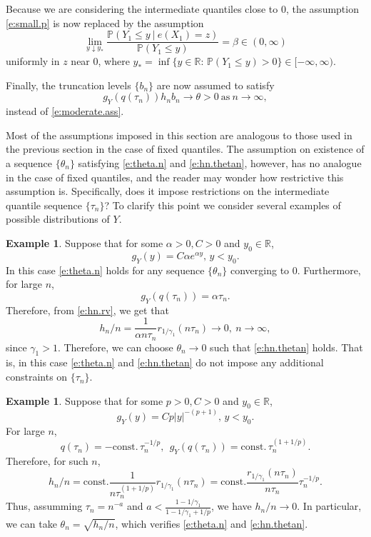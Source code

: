 \documentclass[12pt]{amsart}
\newcommand{\bbr}{\mathbb{R}}
\newcommand{\1}{\mathbbm{1}}
\newcommand{\0}{\mathbf{0}}
\theoremstyle{plain}
\theoremstyle{definition}
\newtheorem{example}[theorem]{Example}
\newcommand{\bbP}{\mathbb{P}}
\begin{document}
Because we are considering the intermediate quantiles close to $0$, the assumption \eqref{e:small.p} is now  replaced by the
assumption
%
\begin{equation} \label{e:small.p.interm}
  \lim_{y\downarrow y_*  } \frac{\bbP(Y_1\leq y\ | \ e(X_1)=z)}{\bbP(Y_1\leq
  y)}=\beta\in (0,\infty)
\end{equation}
%
uniformly in $z$ near 0, where $y_*=\inf\{ y\in\bbr:\, \bbP(Y_1\leq y)>0\}\in [-\infty, \infty)$. 
 

Finally, the truncation levels $\{b_n\}$ are now assumed to satisfy 
\begin{equation} \label{e:bn.ass.interm}
 g_Y(q(\tau_n))   h_nb_n\to \theta>0 \ \text{as} \ n\to\infty,
  \end{equation}
instead of \eqref{e:moderate.ass}. 
 
Most of the assumptions imposed in this section are analogous to those used in the previous section in the case of fixed quantiles. The assumption on existence of a sequence $\{\theta_n\}$ satisfying \eqref{e:theta.n} and \eqref{e:hn.thetan}, however, has no analogue in the case of fixed quantiles, and the reader may wonder how restrictive this assumption is. Specifically, does it impose restrictions on the intermediate quantile sequence $\{\tau_n\}$? To clarify this point we consider several examples of possible distributions of $Y$. 

\begin{example}
\label{ex:example1}
  Suppose that for some $\alpha>0, C>0$ and $y_0\in\bbr$,
\begin{equation*} 
 g_Y(y) = C\alpha e^{\alpha y}, \, y<y_0. 
\end{equation*}
In this case \eqref{e:theta.n} holds for any sequence $\{\theta_n\}$
converging to 0. Furthermore, for large $n$, 
$$
g_Y(q(\tau_n))= \alpha \tau_n.
$$
Therefore, from \eqref{e:hn.rv},  we get that
$$
h_n/n = \frac{1}{\alpha n\tau_n} r_{1/\gamma_1}(n\tau_n) \to 0, \ n\to\infty,
$$
since $\gamma_1>1$. Therefore, we can choose $\theta_n\to 0$ such that 
\eqref{e:hn.thetan} holds. That is, in this case \eqref{e:theta.n} and
\eqref{e:hn.thetan} do not impose any additional constraints on
$\{\tau_n\}$. 
\end{example}

\begin{example}
\label{ex:example2}
  Suppose that for some $p>0, C>0$ and $y_0\in\bbr$,
\begin{equation*} 
 g_Y(y) = Cp|y|^{-(p+1)}, \, y<y_0. 
\end{equation*}
For large $n$, 
$$
q(\tau_n) = -\text{const.}\, \tau_n^{-1/p}, \ \ 
g_Y(q(\tau_n))= \text{const.}\,  \tau_n^{(1+1/p)}.
$$
%
Therefore, for such $n$,
$$
h_n/n =  \text{const.} \frac{1}{n \tau_n^{(1+1/p)}}
r_{1/\gamma_1}(n\tau_n) = \text{const.}
\frac{r_{1/\gamma_1}(n\tau_n)}{n\tau_n} \tau_n^{-1/p}.
$$
Thus, assumming  $\tau_n=n^{-a}$ and $a<\frac{1-1/\gamma_1}{1-1/\gamma_1+1/p}$, we have $h_n/n\to 0$. In particular, we can take $\theta_n=\sqrt{h_n/n}$, which verifies \eqref{e:theta.n} and \eqref{e:hn.thetan}.
\end{example}
\end{document}
